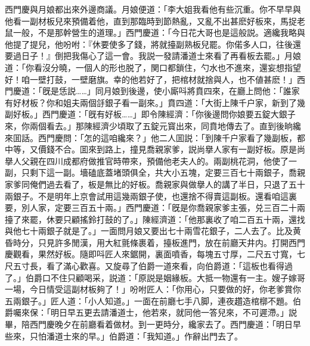 西門慶與月娘都出來外邊商議。月娘便道：「李大姐我看他有些沉重。你不早早與他看一副材板兒來預備着他，直到那臨時到節熱亂，又亂不出甚麽好板來，馬捉老鼠一般，不是那幹營生的道理。」西門慶道：「今日花大哥也是這般説。適纔我略與他提了提兒，他吩咐：『休要使多了錢，將就擡副熟板兒罷。你偌多人口，往後還要過日子！』倒把我傷心了這一會。我説一發請潘道士來看了再看板去罷。」月娘道：「你看沒分曉，一個人的形也脱了，関口都鎖住，勺水也不進來，還妄想指望好！咱一壁打鼓，一壁磨旗。幸的他若好了，把棺材就捨與人，也不値甚麽！」西門慶道：「旣是恁説……」同月娘到後邊，使小廝呌將賁四來，在廳上問他：「誰家有好材板？你和姐夫兩個㧱銀子看一副來。」賁四道：「大街上陳千户家，新到了幾副好板。」西門慶道：「旣有好板……」即令陳經濟：「你後邊問你娘要五錠大銀子來，你兩個看去。」那陳經濟少頃取了五錠元寳出來，同賁地傳去了。直到後晌纔來囬話。西門慶問：「怎的這咱纔來？」他二人囬説：「到陳千户家看了幾副板，都中等，又價錢不合。囬來到路上，撞見喬親家爹，説尚擧人家有一副好板。原是尚擧人父親在四川成都府做推官時帶來，預備他老夫人的。兩副桃花洞，他使了一副，只剩下這一副。墻磕底蓋堵頭俱全，共大小五塊，定要三百七十兩銀子，喬親家爹同俺們過去看了，板是無比的好板。喬親家與做擧人的講了半日，只退了五十兩銀子。不是明年上京會試用這幾兩銀子使，也還捨不得賣這副板。還看咱這裏要，別人家，定要三百五十兩。」西門慶道：「旣是你喬親家爹主張，兑三百二十兩擡了來罷，休要只顧搖鈴打鼓的了。」陳經濟道：「他那裏收了咱二百五十兩，還找與他七十兩銀子就是了。」一面問月娘又要出七十兩雪花銀子，二人去了。比及黄昏時分，只見許多閒漢，用大紅氈條裹着，擡板進門，放在前廳天井内。打開西門慶觀看，果然好板。隨即呌匠人來鋸開，裏面噴香，每塊五寸厚，二尺五寸寬，七尺五寸長，看了滿心歡喜。又旋尋了伯爵一道來看，向伯爵道：「這板也看得過了。」伯爵口不住只顧喝采，説道：「原説是姻緣板。大抵一物還有一主。嫂子嫁哥一場，今日情受這副材板夠了！」吩咐匠人：「你用心，只要做的好，你老爹賞你五兩銀子。」匠人道：「小人知道。」一面在前廳七手八脚，連夜趲造棺槨不題。伯爵囑來保：「明日早五更去請潘道士，他若來，就同他一答兒來，不可遲滯。」説畢，陪西門慶晚夕在前廳看着做材。到一更時分，纔家去了。西門慶道：「明日早些來，只怕潘道士來的早。」伯爵道：「我知道。」作辭出門去了。

